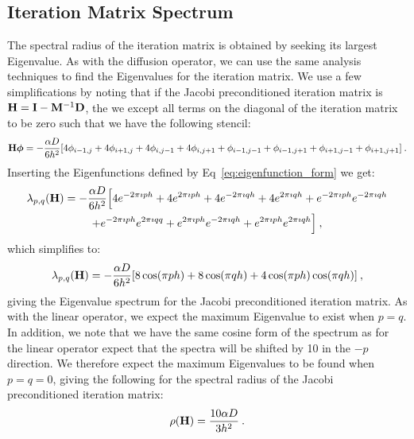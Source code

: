 \documentclass{mc2013}
\begin{document}
\subsection{Iteration Matrix Spectrum}
\label{subsec:iteration_spectrum}

The spectral radius of the iteration matrix is obtained by seeking its
largest Eigenvalue. As with the diffusion operator, we can use the
same analysis techniques to find the Eigenvalues for the iteration
matrix. We use a few simplifications by noting that if the Jacobi
preconditioned iteration matrix is $\mathbf{H} = \mathbf{I} -
\mathbf{M}^{-1}\mathbf{D}$, the we except all terms on the diagonal of the
iteration matrix to be zero such that we have the following stencil:
\begin{equation}
  \mathbf{H}\boldsymbol{\phi} = -\frac{\alpha D}{6h^2}[4 \phi_{i-1,j}
    + 4 \phi_{i+1,j} + 4 \phi_{i,j-1} + 4 \phi_{i,j+1} +
    \phi_{i-1,j-1} + \phi_{i-1,j+1} + \phi_{i+1,j-1} +
    \phi_{i+1,j+1}]\:.
  \label{eq:iteration_stencil}
\end{equation}
Inserting the Eigenfunctions defined by Eq~\ref{eq:eigenfunction_form}
we get:
\begin{multline}
  \lambda_{p,q}(\mathbf{H}) = -\frac{\alpha D}{6h^2}\Big[4 e^{-2 \pi \imath p
      h} + 4 e^{2 \pi \imath p h} + 4 e^{-2 \pi \imath q h} + 4 e^{2
      \pi \imath q h} + e^{-2 \pi \imath p h} e^{-2 \pi \imath q h}
    \\ + e^{-2 \pi \imath p h} e^{2 \pi \imath q q} + e^{2 \pi \imath
      p h} e^{-2 \pi \imath q h} + e^{2 \pi \imath p h} e^{2 \pi
      \imath q h}\Big]\:,
  \label{eq:iteration_deriv}
\end{multline}
which simplifies to:
\begin{equation}
  \lambda_{p,q}(\mathbf{H}) = -\frac{\alpha D}{6h^2}[ 8 \cos(\pi p h) + 8
    \cos(\pi q h) + 4 \cos(\pi p h) \cos(\pi q h)]\:,
  \label{eq:iteration_spectrum}
\end{equation}
giving the Eigenvalue spectrum for the Jacobi preconditioned iteration
matrix. As with the linear operator, we expect the maximum Eigenvalue
to exist when $p=q$. In addition, we note that we have the same cosine
form of the spectrum as for the linear operator expect that the
spectra will be shifted by 10 in the $-p$ direction. We therefore
expect the maximum Eigenvalues to be found when $p=q=0$, giving the
following for the spectral radius of the Jacobi preconditioned
iteration matrix:
\begin{equation}
  \rho(\mathbf{H}) = \frac{10 \alpha D}{3 h^2}\:.
  \label{eq:iteration_radius}
\end{equation}
\end{document}
